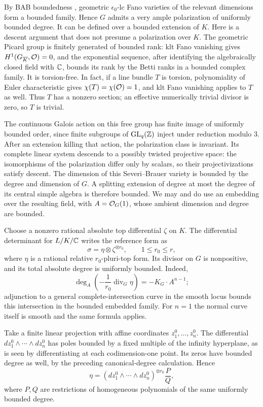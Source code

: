 By BAB boundedness \cite[Theorem~1.1]{BAB}, geometric
\(\epsilon_0\)-lc Fano varieties of the relevant dimensions form a
bounded family. Hence \(G\) admits a very ample polarization of uniformly
bounded degree. It can be defined over a bounded extension of \(K\).
Here is a descent
argument that does not presume a polarization over \(K\).  The geometric
Picard group is finitely generated of bounded rank: klt Fano vanishing
gives \(H^1(G_{\overline K},\mathcal O)=0\), and the exponential sequence, after
identifying the algebraically closed field with \(\mathbb C\), bounds its rank
by the Betti ranks in a bounded complex family.  It is torsion-free.  In
fact, if a line bundle \(T\) is torsion, polynomiality of Euler
characteristic gives \(\chi(T)=\chi(\mathcal O)=1\), and klt Fano vanishing
applies to \(T\) as well.  Thus \(T\) has a nonzero section; an effective
numerically trivial divisor is zero, so \(T\) is trivial.

The continuous Galois action on this free group has finite image of
uniformly bounded order, since finite subgroups of \(\mathrm{GL}_q(\mathbb Z)\)
inject under reduction modulo \(3\).  After an extension killing that
action, the polarization class is invariant.  Its complete linear system
descends to a possibly twisted projective space: the isomorphisms of the
polarization differ only by scalars, so their projectivizations satisfy
descent.  The dimension of this Severi--Brauer variety is bounded by the
degree and dimension of \(G\).  A splitting extension of degree at most
the degree of its central simple algebra is therefore bounded.  We may
and do use an embedding over the resulting field, with
\(A=\mathcal O_G(1)\), whose ambient dimension and degree are bounded.

Choose a nonzero rational absolute top differential \(\zeta\) on \(K\).
The differential determinant for \(L/K/\mathbb C\) writes the reference form as
\begin{equation}
 \sigma=\eta\otimes\zeta^{\otimes r_0},\qquad 1\le r_0\le r,
 \label{bounded:relative-form}
\end{equation}
where \(\eta\) is a rational relative \(r_0\)-pluri-top form.
Its divisor on \(G\) is nonpositive, and its total absolute degree is
uniformly bounded.  Indeed,
\[
 \deg_A\!\left(-\frac1{r_0}\operatorname{div}_G\eta\right)
 =-K_G\cdot A^{n-1};
\]
adjunction to a general complete-intersection curve in the smooth locus
bounds this intersection in the bounded embedded family.  For \(n=1\)
the normal curve itself is smooth and the same formula applies.

Take a finite linear projection with affine coordinates
\(z^0_1,\ldots,z^0_n\).  The differential
\(dz^0_1\wedge\cdots\wedge dz^0_n\) has poles bounded by a fixed
multiple of the infinity hyperplane, as is seen by differentiating at
each codimension-one point.  Its zeros have bounded degree as well, by
the preceding canonical-degree calculation.  Hence
\begin{equation}
 \eta=(dz^0_1\wedge\cdots\wedge dz^0_n)^{\otimes r_0}\frac{P}{Q},
 \label{bounded:polynomial-form}
\end{equation}
where \(P,Q\) are restrictions of homogeneous polynomials of the same
uniformly bounded degree.

